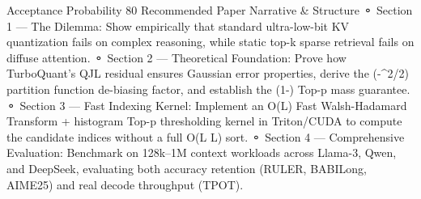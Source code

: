 Acceptance Probability	80%
Recommended Paper Narrative & Structure
⚬ Section 1 — The Dilemma: Show empirically that standard ultra-low-bit KV quantization fails on complex reasoning, while static top-k sparse retrieval fails on diffuse attention.
⚬ Section 2 — Theoretical Foundation: Prove how TurboQuant’s QJL residual ensures Gaussian error properties, derive the \exp(-\sigma^2/2) partition function de-biasing factor, and establish the (1-\epsilon) Top-p mass guarantee.
⚬ Section 3 — Fast Indexing Kernel: Implement an O(L) Fast Walsh-Hadamard Transform + histogram Top-p thresholding kernel in Triton/CUDA to compute the candidate indices without a full O(L \log L) sort.
⚬ Section 4 — Comprehensive Evaluation: Benchmark on 128k–1M context workloads across Llama-3, Qwen, and DeepSeek, evaluating both accuracy retention (RULER, BABILong, AIME25) and real decode throughput (TPOT).